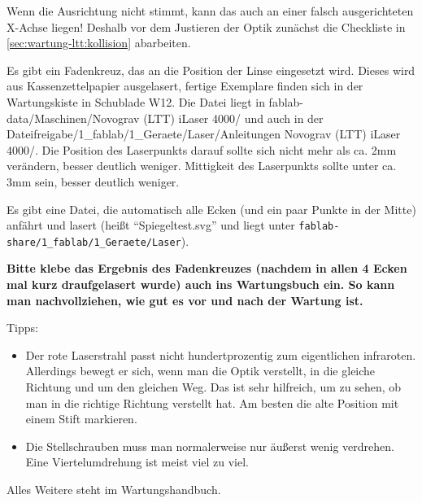 \documentclass{\basedir/fablab-document}
\begin{document}
Wenn die Ausrichtung nicht stimmt, kann das auch an einer falsch ausgerichteten X-Achse liegen! Deshalb vor dem Justieren der Optik zunächst die Checkliste in \cref{sec:wartung-ltt:kollision} abarbeiten.

Es gibt ein Fadenkreuz, das an die Position der Linse eingesetzt wird. Dieses wird aus Kassenzettelpapier ausgelasert, fertige Exemplare finden sich in der Wartungskiste in Schublade W12. Die Datei liegt in fablab-data/Maschinen/Novograv (LTT) iLaser 4000/ und auch in der Dateifreigabe/1\_fablab/1\_Geraete/Laser/Anleitungen Novograv  (LTT) iLaser 4000/. Die Position des Laserpunkts darauf sollte sich nicht mehr als ca. 2mm verändern, besser deutlich weniger. Mittigkeit des Laserpunkts sollte unter ca. 3mm sein, besser deutlich weniger.

Es gibt eine Datei, die automatisch alle Ecken (und ein paar Punkte in der Mitte) anfährt und lasert (heißt \enquote{Spiegeltest.svg} und liegt unter \verb|fablab-share/1_fablab/1_Geraete/Laser|).

\textbf{Bitte klebe das Ergebnis des Fadenkreuzes (nachdem in allen 4 Ecken mal kurz draufgelasert wurde) auch ins Wartungsbuch ein. So kann man nachvollziehen, wie gut es vor und nach der Wartung ist.}

Tipps:
\begin{itemize}
	\item Der rote Laserstrahl passt nicht hundertprozentig zum eigentlichen infraroten. Allerdings bewegt er sich, wenn man die Optik verstellt, in die gleiche Richtung und um den gleichen Weg. Das ist sehr hilfreich, um zu sehen, ob man in die richtige Richtung verstellt hat. Am besten die alte Position mit einem Stift markieren.

	\item Die Stellschrauben muss man normalerweise nur äußerst wenig verdrehen. Eine Viertelumdrehung ist meist viel zu viel.
\end{itemize}

Alles Weitere steht im Wartungshandbuch.
\end{document}
